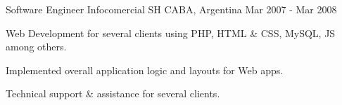 \begin{cventries}
  \cventry
    {Software Engineer}
    {Infocomercial SH}
    {CABA, Argentina}
    {Mar 2007 - Mar 2008}
    {
      \begin{cvitems}
        \item {Web Development for several clients using PHP, HTML \& CSS, MySQL, JS among others.}
        \item {Implemented overall application logic and layouts for Web apps.}
        \item {Technical support \& assistance for several clients.}
      \end{cvitems}
    }  
\end{cventries}
